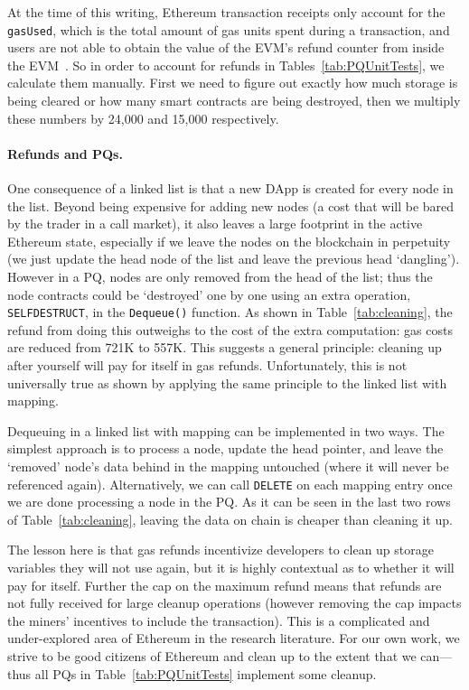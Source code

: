 At the time of this writing, Ethereum transaction receipts only account for the \texttt{gasUsed}, which is the total amount of gas units spent during a transaction, and users are not able to obtain the value of the EVM's refund counter from inside the EVM~\cite{signer2018gas}. So in order to account for refunds in Tables~\ref{tab:PQUnitTests}, we calculate them manually. First we need to figure out exactly how much storage is being cleared or how many smart contracts are being destroyed, then we multiply these numbers by 24,000 and 15,000 respectively. 

\paragraph{Refunds and PQs.}

One consequence of a linked list is that a new DApp is created for every node in the list. Beyond being expensive for adding new nodes (a cost that will be bared by the trader in a call market), it also leaves a large footprint in the active Ethereum state, especially if we leave the nodes on the blockchain in perpetuity (\ie we just update the head node of the list and leave the previous head `dangling'). However in a PQ, nodes are only removed from the head of the list; thus the node contracts could be `destroyed' one by one using an extra operation, \texttt{SELFDESTRUCT}, in the \texttt{Dequeue()} function. As shown in Table~\ref{tab:cleaning}, the refund from doing this outweighs to the cost of the extra computation: gas costs are reduced from 721K to 557K.  This suggests a general principle: cleaning up after yourself will pay for itself in gas refunds. Unfortunately, this is not universally true as shown by applying the same principle to the linked list with mapping. 

Dequeuing in a linked list with mapping can be implemented in two ways. The simplest approach is to process a node, update the head pointer, and leave the `removed' node's data behind in the mapping untouched (where it will never be referenced again). Alternatively, we can call \texttt{DELETE} on each mapping entry once we are done processing a node in the PQ. As it can be seen in the last two rows of Table~\ref{tab:cleaning}, leaving the data on chain is cheaper than cleaning it up.

The lesson here is that gas refunds incentivize developers to clean up storage variables they will not use again, but it is highly contextual as to whether it will pay for itself. Further the cap on the maximum refund means that refunds are not fully received for large cleanup operations (however removing the cap impacts the miners' incentives to include the transaction). This is a complicated and under-explored area of Ethereum in the research literature. For our own work, we strive to be good citizens of Ethereum and clean up to the extent that we can---thus all PQs in Table~\ref{tab:PQUnitTests} implement some cleanup.





